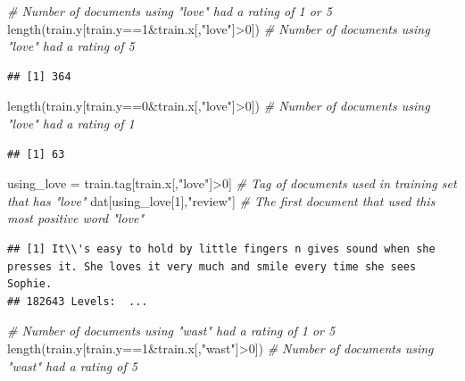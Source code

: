 \documentclass[
]{article}
\newenvironment{Shaded}{\begin{snugshade}}{\end{snugshade}}
\newcommand{\CommentTok}[1]{\textcolor[rgb]{0.56,0.35,0.01}{\textit{#1}}}
\newcommand{\DecValTok}[1]{\textcolor[rgb]{0.00,0.00,0.81}{#1}}
\newcommand{\FunctionTok}[1]{\textcolor[rgb]{0.00,0.00,0.00}{#1}}
\newcommand{\NormalTok}[1]{#1}
\newcommand{\OtherTok}[1]{\textcolor[rgb]{0.56,0.35,0.01}{#1}}
\newcommand{\SpecialCharTok}[1]{\textcolor[rgb]{0.00,0.00,0.00}{#1}}
\newcommand{\StringTok}[1]{\textcolor[rgb]{0.31,0.60,0.02}{#1}}
\begin{document}
\begin{Shaded}
\begin{Highlighting}[]
\CommentTok{\# Number of documents using "love" had a rating of 1 or 5}
\FunctionTok{length}\NormalTok{(train.y[train.y}\SpecialCharTok{==}\DecValTok{1}\SpecialCharTok{\&}\NormalTok{train.x[,}\StringTok{"love"}\NormalTok{]}\SpecialCharTok{\textgreater{}}\DecValTok{0}\NormalTok{]) }\CommentTok{\# Number of documents using "love" had a rating of 5}
\end{Highlighting}
\end{Shaded}

\begin{verbatim}
## [1] 364
\end{verbatim}

\begin{Shaded}
\begin{Highlighting}[]
\FunctionTok{length}\NormalTok{(train.y[train.y}\SpecialCharTok{==}\DecValTok{0}\SpecialCharTok{\&}\NormalTok{train.x[,}\StringTok{"love"}\NormalTok{]}\SpecialCharTok{\textgreater{}}\DecValTok{0}\NormalTok{]) }\CommentTok{\# Number of documents using "love" had a rating of 1}
\end{Highlighting}
\end{Shaded}

\begin{verbatim}
## [1] 63
\end{verbatim}

\begin{Shaded}
\begin{Highlighting}[]
\NormalTok{using\_love }\OtherTok{=}\NormalTok{ train.tag[train.x[,}\StringTok{"love"}\NormalTok{]}\SpecialCharTok{\textgreater{}}\DecValTok{0}\NormalTok{] }\CommentTok{\# Tag of documents used in training set that has "love"}
\NormalTok{dat[using\_love[}\DecValTok{1}\NormalTok{],}\StringTok{"review"}\NormalTok{] }\CommentTok{\# The first document that used this most positive word "love"}
\end{Highlighting}
\end{Shaded}

\begin{verbatim}
## [1] It\\'s easy to hold by little fingers n gives sound when she presses it. She loves it very much and smile every time she sees Sophie.
## 182643 Levels:  ...
\end{verbatim}

\begin{Shaded}
\begin{Highlighting}[]
\CommentTok{\# Number of documents using "wast" had a rating of 1 or 5}
\FunctionTok{length}\NormalTok{(train.y[train.y}\SpecialCharTok{==}\DecValTok{1}\SpecialCharTok{\&}\NormalTok{train.x[,}\StringTok{"wast"}\NormalTok{]}\SpecialCharTok{\textgreater{}}\DecValTok{0}\NormalTok{]) }\CommentTok{\# Number of documents using "wast" had a rating of 5}
\end{Highlighting}
\end{Shaded}
\end{document}
